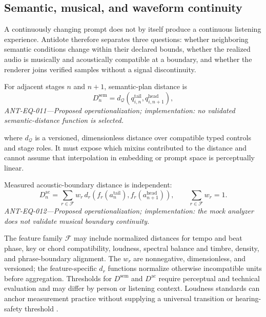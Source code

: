 
\subsection{Semantic, musical, and waveform continuity}
\label{sec:design-continuity}

A continuously changing prompt does not by itself produce a continuous
listening experience. Antidote therefore separates three questions: whether
neighboring semantic conditions change within their declared bounds, whether
the realized audio is musically and acoustically compatible at a boundary, and
whether the renderer joins verified samples without a signal discontinuity.

For adjacent stages $n$ and $n+1$, semantic-plan distance is
\begin{equation}
  D^{\mathrm{sem}}_n
  = d_{\mathcal{Q}}\!\left(q^{\mathrm{tail}}_{i,n},
                           q^{\mathrm{head}}_{i,n+1}\right),
  \label{eq:semantic-continuity}
\end{equation}
\noindent\textit{ANT-EQ-011---Proposed operationalization; implementation:
no validated semantic-distance function is selected.}

where $d_{\mathcal{Q}}$ is a versioned, dimensionless distance over compatible
typed controls and stage roles. It must expose which mixins contributed to the
distance and cannot assume that interpolation in embedding or prompt space is
perceptually linear.

Measured acoustic-boundary distance is independent:
\begin{equation}
  D^{\mathrm{ac}}_n
  = \sum_{r\in\mathcal{F}}
    w_r\,
    d_r\!\left(
      f_r(a^{\mathrm{tail}}_n),
      f_r(a^{\mathrm{head}}_{n+1})
    \right),
  \qquad \sum_{r\in\mathcal{F}}w_r=1.
  \label{eq:acoustic-continuity}
\end{equation}
\noindent\textit{ANT-EQ-012---Proposed operationalization; implementation:
the mock analyzer does not validate musical boundary continuity.}

The feature family $\mathcal{F}$ may include normalized distances for tempo and
beat phase, key or chord compatibility, loudness, spectral balance and timbre,
density, and phrase-boundary alignment. The $w_r$ are nonnegative,
dimensionless, and versioned; the feature-specific $d_r$ functions normalize
otherwise incompatible units before aggregation. Thresholds for
$D^{\mathrm{sem}}$ and $D^{\mathrm{ac}}$ require perceptual and technical
evaluation and may differ by person or listening context. Loudness standards
can anchor measurement practice without supplying a universal transition or
hearing-safety threshold \citep{ebu2023r128}.

